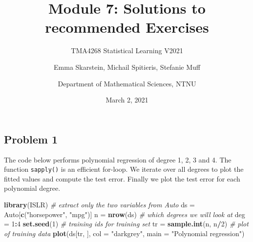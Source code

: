 \documentclass[]{article}
\title{Module 7: Solutions to recommended Exercises}
\subtitle{TMA4268 Statistical Learning V2021}
\author{Emma Skarstein, Michail Spitieris, Stefanie Muff \and Department of Mathematical Sciences, NTNU}
\date{March 2, 2021}
\newenvironment{Shaded}{\begin{snugshade}}{\end{snugshade}}
\newcommand{\CommentTok}[1]{\textcolor[rgb]{0.56,0.35,0.01}{\textit{#1}}}
\newcommand{\DataTypeTok}[1]{\textcolor[rgb]{0.13,0.29,0.53}{#1}}
\newcommand{\DecValTok}[1]{\textcolor[rgb]{0.00,0.00,0.81}{#1}}
\newcommand{\KeywordTok}[1]{\textcolor[rgb]{0.13,0.29,0.53}{\textbf{#1}}}
\newcommand{\NormalTok}[1]{#1}
\newcommand{\OperatorTok}[1]{\textcolor[rgb]{0.81,0.36,0.00}{\textbf{#1}}}
\newcommand{\StringTok}[1]{\textcolor[rgb]{0.31,0.60,0.02}{#1}}
\begin{document}
\maketitle

\hypertarget{problem-1}{%
\subsection{Problem 1}\label{problem-1}}

The code below performs polynomial regression of degree 1, 2, 3 and 4.
The function \texttt{sapply()} is an efficient for-loop. We iterate over
all degrees to plot the fitted values and compute the test error.
Finally we plot the test error for each polynomial degree.

\begin{Shaded}
\begin{Highlighting}[]
\KeywordTok{library}\NormalTok{(ISLR)}
\CommentTok{# extract only the two variables from Auto}
\NormalTok{ds =}\StringTok{ }\NormalTok{Auto[}\KeywordTok{c}\NormalTok{(}\StringTok{"horsepower"}\NormalTok{, }\StringTok{"mpg"}\NormalTok{)]}
\NormalTok{n =}\StringTok{ }\KeywordTok{nrow}\NormalTok{(ds)}
\CommentTok{# which degrees we will look at}
\NormalTok{deg =}\StringTok{ }\DecValTok{1}\OperatorTok{:}\DecValTok{4}
\KeywordTok{set.seed}\NormalTok{(}\DecValTok{1}\NormalTok{)}
\CommentTok{# training ids for training set}
\NormalTok{tr =}\StringTok{ }\KeywordTok{sample.int}\NormalTok{(n, n}\OperatorTok{/}\DecValTok{2}\NormalTok{)}
\CommentTok{# plot of training data}
\KeywordTok{plot}\NormalTok{(ds[tr, ], }\DataTypeTok{col =} \StringTok{"darkgrey"}\NormalTok{, }\DataTypeTok{main =} \StringTok{"Polynomial regression"}\NormalTok{)}


\end{Highlighting}
\end{Shaded}
\end{document}
